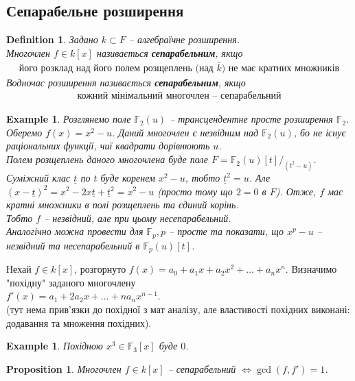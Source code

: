 \documentclass[a4paper, 10pt]{article}
\theoremstyle{theoremdd}
\theoremstyle{theoremdd}
\newtheorem{definition}[theorem]{Definition}
\theoremstyle{theoremdd}
\theoremstyle{theoremdd}
\theoremstyle{theoremdd}
\newtheorem{example}[theorem]{Example}
\theoremstyle{theoremdd}
\theoremstyle{theoremdd}
\theoremstyle{theoremdd}
\theoremstyle{theoremdd}
\newtheorem{proposition}[theorem]{Proposition}
\theoremstyle{theoremdd}
\theoremstyle{theoremdd}
\theoremstyle{theoremdd}
\theoremstyle{theoremdd}
\theoremstyle{theoremdd}
\theoremstyle{theoremdd}
\begin{document}
\subsection{Сепарабельне розширення}
\begin{definition}
Задано $k \subset F$ -- алгебраїчне розширення.\\
Многочлен $f \in k[x]$ називається \textbf{сепарабельним}, якщо
\begin{align*}
\text{його розклад над його полем розщеплень (над $\bar{k}$) не має кратних множників}
\end{align*}
Водночас розширення називається \textbf{сепарабельним}, якщо
\begin{align*}
\text{кожний мінімальний многочлен -- сепарабельний}
\end{align*}
\end{definition}

\begin{example}
Розглянемо поле $\mathbb{F}_2(u)$ -- трансцендентне просте розширення $\mathbb{F}_2$. Оберемо $f(x) = x^2 - u$. Даний многочлен є незвідним над $\mathbb{F}_2(u)$, бо не існує раціональних функції, чиї квадрати дорівнюють $u$.\\
Полем розщеплень даного многочлена буде поле $F = \mathbb{F}_2(u)[t]/_{(t^2-u)}$. Суміжний клас $\underline{t}$ по $t$ буде коренем $x^2-u$, тобто $\underline{t}^2 = u$. Але $(x-\underline{t})^2 = x^2 - 2x\underline{t} + \underline{t}^2 = x^2 - u$ (просто тому що $2 = 0$ в $F$). Отже, $f$ має кратні множники в полі розщеплень та єдиний корінь.\\
Тобто $f$ -- незвідний, але при цьому несепарабельний.\\
Аналогічно можна провести для $\mathbb{F}_p, p$ -- просте та показати, що $x^p - u$ -- незвідний та несепарабельний в $\mathbb{F}_p(u)[t]$.
\end{example}

Нехай $f \in k[x]$, розгорнуто $f(x) = a_0 + a_1 x + a_2 x^2 + \dots + a_n x^n$. Визначимо "похідну" заданого многочлену\\
$f'(x) = a_1 + 2a_2 x + \dots + n a_n x^{n-1}$.\\
(тут нема прив'язки до похідної з мат аналізу, але властивості похідних виконані: додавання та множення похідних).

\begin{example}
Похідною $x^3 \in \mathbb{F}_3[x]$ буде $0$.
\end{example}

\begin{proposition}
Многочлен $f \in k[x]$ -- сепарабельний $\iff \gcd(f,f') = 1$.
\end{proposition}
\end{document}
